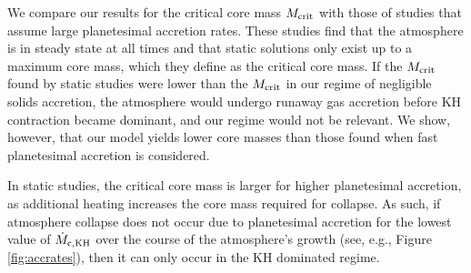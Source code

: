 \documentclass[apj]{emulateapj}
\newcommand{\co}{_{\rm c}}
\begin{document}
We compare our results for the critical core mass $M_{\rm crit}$ with those of studies that assume large planetesimal accretion rates. These studies find that the atmosphere is in steady state at all times and that static solutions only exist up to a maximum core mass, which they define as the critical core mass. If the $M_{\rm crit}$ found by static studies were lower than the $M_{\rm crit}$ in our regime of negligible solids accretion, the atmosphere would undergo runaway gas accretion before KH contraction became dominant, and our regime would not be relevant. We show, however, that our model yields lower core masses than those found when fast planetesimal accretion is considered. 

In static studies, the critical core mass is larger for higher planetesimal accretion, as additional heating increases the core mass required for collapse. As such, if atmosphere collapse does not occur due to planetesimal accretion for the lowest value of $\dot{M}_{\rm c, KH}$ over the course of the atmosphere's growth (see, e.g., Figure \ref{fig:accrates}), then it can only occur in the KH dominated regime. %




\end{document}
